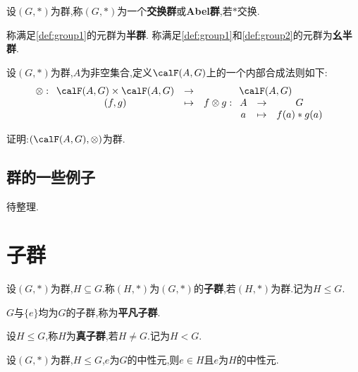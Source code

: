\begin{deff}
    设$(G, *)$为群,称$(G, *)$为一个\textbf{交换群}或\textbf{Abel群},若$*$交换.
\end{deff}

\begin{rqq}
    称满足\ref{def:group1}的元群为\textbf{半群}.
    称满足\ref{def:group1}和\ref{def:group2}的元群为\textbf{幺半群}.
\end{rqq}

\begin{exer}
    设$(G, *)$为群,$A$为非空集合,定义$\calF(A, G)$上的一个内部合成法则如下:\[ \otimes: \begin{array}[t]{ccc} \calF(A, G) \times \calF(A, G) & \to & \calF(A, G) \\ (f, g) & \tp & f \otimes g: \begin{array}[t]{ccc} A & \to & G \\ a & \tp & f(a) * g(a) \end{array} \end{array} \]
    
    证明:$(\calF(A, G), \otimes)$为群.
\end{exer}

\subsection*{群的一些例子}

待整理.

\section{子群}

\begin{deff}
    设$(G, *)$为群,$H \subseteq G$.称$(H, *)$为$(G, *)$的\textbf{子群},若$(H, *)$为群.记为$H \leqslant G$.
\end{deff}

\begin{rqq}
    $G$与$\{ e \}$均为$G$的子群,称为\textbf{平凡子群}.
\end{rqq}

\begin{deff}
    设$H \leqslant G$,称$H$为\textbf{真子群},若$H \neq G$.记为$H < G$.
\end{deff}

\begin{prop}
    设$(G, *)$为群,$H \leqslant G$,$e$为$G$的中性元,则$e \in H$且$e$为$H$的中性元.
\end{prop}


